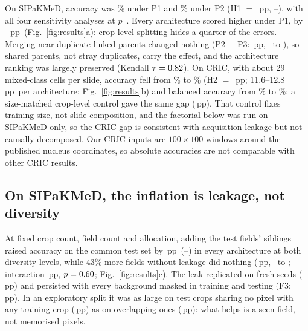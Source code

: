 \documentclass{article}
\newcommand{\pp}{\,pp}
\begin{document}
On SIPaKMeD, accuracy was \SipPOneAcc\% under P1 and \SipPTwoAcc\% under P2 (H1 $=$ \HoneEst\pp, \HoneBootLo--\HoneBootHi), with all four sensitivity analyses at $p$~\HoneKRp. Every architecture scored higher under P1, by \HoneArchMin--\HoneArchMax\pp\ (Fig.~\ref{fig:results}a): crop-level splitting hides a quarter of the errors. Merging near-duplicate-linked parents changed nothing (P2 $-$ P3: \PtwoPthreeEst\pp, \PtwoPthreeLo\ to \PtwoPthreeHi), so shared parents, not stray duplicates, carry the effect, and the architecture ranking was largely preserved (Kendall $\tau=0.82$). On CRIC, with about 29 mixed-class cells per slide, accuracy fell from \CricPOneAcc\% to \CricPTwoAcc\% (H2 $=$ \HtwoEst\pp; 11.6--12.8\pp\ per architecture; Fig.~\ref{fig:results}b) and balanced accuracy from \CricPOneBacc\% to \CricPTwoBacc\%; a size-matched crop-level control gave the same gap (\CricPrimeEst\pp). That control fixes training size, not slide composition, and the factorial below was run on SIPaKMeD only, so the CRIC gap is consistent with acquisition leakage but not causally decomposed. Our CRIC inputs are $100\times100$ windows around the published nucleus coordinates, so absolute accuracies are not comparable with other CRIC results.

\subsection{On SIPaKMeD, the inflation is leakage, not diversity}
\label{sec:res-isolation}

At fixed crop count, field count and allocation, adding the test fields' siblings raised accuracy on the common test set by \HthreeEst\pp\ (\HthreeLo--\HthreeHi) in every architecture at both diversity levels, while 43\% more fields without leakage did nothing (\DivEst\pp, \DivLo\ to \DivHi; interaction \InteractionEst\pp, $p=0.60$; Fig.~\ref{fig:results}c). The leak replicated on fresh seeds (\HthreeRepEst\pp) and persisted with every background masked in training and testing (F3: \FthreeEst\pp). In an exploratory split it was as large on test crops sharing no pixel with any training crop (\OverlapNo\pp) as on overlapping ones (\OverlapYes\pp): what helps is a seen field, not memorised pixels.
\end{document}
